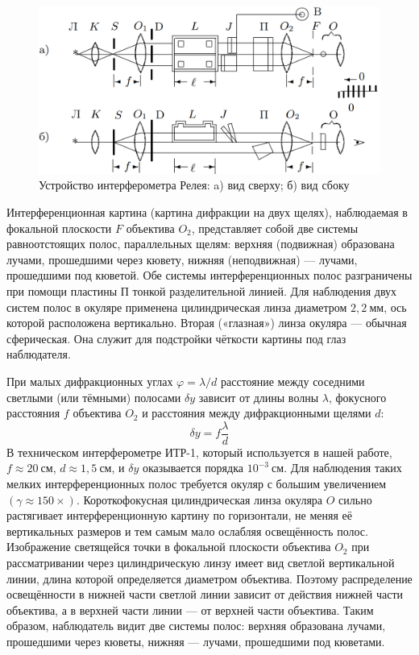 \documentclass[12pt]{article}
\begin{document}
    \begin{figure}[h]
        \centering
        \includegraphics[width=0.8\linewidth]{pic/setup}
        \caption{Устройство интерферометра Релея: a) вид сверху; б) вид сбоку}
        \label{fig:fig1}
    \end{figure}


    Интерференционная картина (картина дифракции на двух щелях), наблюдаемая в фокальной плоскости $F$ объектива $O_2$,
    представляет собой две системы равноотстоящих полос, параллельных щелям:
    верхняя (подвижная) образована лучами, прошедшими через кювету, нижняя (неподвижная) — лучами, прошедшими под кюветой.
    Обе системы интерференционных полос разграничены при помощи пластины $\text{П}$ тонкой разделительной линией.
    Для наблюдения двух систем полос в окуляре применена цилиндрическая линза диаметром $2,2\ \text{мм}$,
    ось которой расположена вертикально.
    Вторая («глазная») линза окуляра — обычная сферическая.
    Она служит для подстройки чёткости картины под глаз наблюдателя.

    При малых дифракционных углах $\varphi = \lambda/d$ расстояние между соседними светлыми (или тёмными) полосами
    $\delta y$ зависит от длины волны $\lambda$, фокусного расстояния $f$ объектива $O_2$
    и расстояния между дифракционными щелями $d$:
    \begin{equation}
        \delta y = f\frac{\lambda}{d}
        \label{eq:eq1}
    \end{equation}
    В техническом интерферометре ИТР-1, который используется в нашей работе,
    $f \approx 20\ \text{см}$, $d \approx 1,5\ \text{см}$, и $\delta y$ оказывается порядка $10^{-3}\ \text{см}$.
    Для наблюдения таких мелких интерференционных полос требуется окуляр
    с большим увеличением $(\gamma \approx 150\times)$.
    Короткофокусная цилиндрическая линза окуляра $O$ сильно растягивает интерференционную картину по горизонтали,
    не меняя её вертикальных размеров и тем самым мало ослабляя освещённость полос.
    Изображение светящейся точки в фокальной плоскости объектива $O_2$ при рассматривании через цилиндрическую линзу
    имеет вид светлой вертикальной линии, длина которой определяется диаметром объектива.
    Поэтому распределение освещённости в нижней части светлой линии зависит от действия нижней части объектива,
    а в верхней части линии — от верхней части объектива.
    Таким образом, наблюдатель видит две системы полос: верхняя образована лучами, прошедшими через кюветы,
    нижняя — лучами, прошедшими под кюветами.
\end{document}
